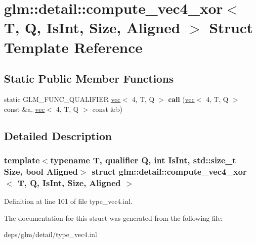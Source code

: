 \hypertarget{structglm_1_1detail_1_1compute__vec4__xor}{}\section{glm\+:\+:detail\+:\+:compute\+\_\+vec4\+\_\+xor$<$ T, Q, Is\+Int, Size, Aligned $>$ Struct Template Reference}
\label{structglm_1_1detail_1_1compute__vec4__xor}
\subsection*{Static Public Member Functions}
\begin{DoxyCompactItemize}
\item 
\mbox{\label{structglm_1_1detail_1_1compute__vec4__xor_ad31aa7edcbc6cadcb41b9f9aac4c7c50}} 
static G\+L\+M\+\_\+\+F\+U\+N\+C\+\_\+\+Q\+U\+A\+L\+I\+F\+I\+ER \hyperlink{structglm_1_1vec}{vec}$<$ 4, T, Q $>$ {\bfseries call} (\hyperlink{structglm_1_1vec}{vec}$<$ 4, T, Q $>$ const \&a, \hyperlink{structglm_1_1vec}{vec}$<$ 4, T, Q $>$ const \&b)
\end{DoxyCompactItemize}


\subsection{Detailed Description}
\subsubsection*{template$<$typename T, qualifier Q, int Is\+Int, std\+::size\+\_\+t Size, bool Aligned$>$\newline
struct glm\+::detail\+::compute\+\_\+vec4\+\_\+xor$<$ T, Q, Is\+Int, Size, Aligned $>$}



Definition at line 101 of file type\+\_\+vec4.\+inl.



The documentation for this struct was generated from the following file\+:\begin{DoxyCompactItemize}
\item 
deps/glm/detail/type\+\_\+vec4.\+inl\end{DoxyCompactItemize}
